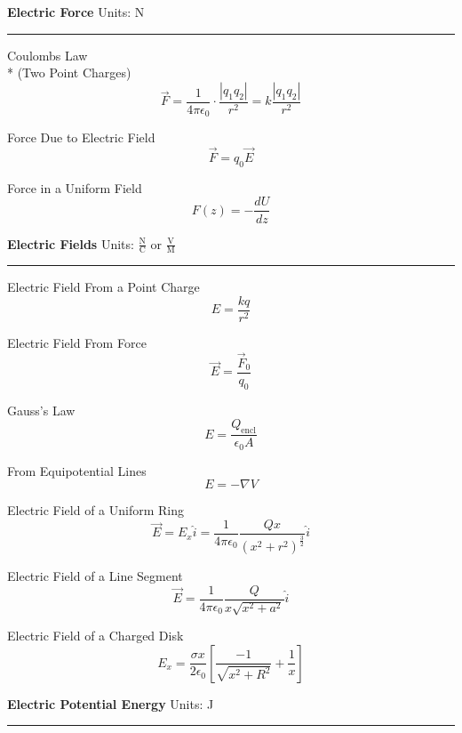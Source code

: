 \documentclass{article}
\begin{document}
\noindent \large \textbf{Electric Force}\normalsize \qquad
Units: N\\
\noindent\rule{\textwidth}{0.5pt}

\begin{center}
\begin{multicols}{3}

Coulombs Law\\*
\footnotesize (Two Point Charges) \normalsize
\[
    \vec{F} = \frac{1}{4\pi\epsilon_0}\cdot\frac{|q_1q_2|}{r^2} = k\frac{|q_1q_2|}{r^2}
\]

Force Due to Electric Field
\[
    \vec{F} = q_0\vec{E}
\]

Force in a Uniform Field
\[
    F(z) = -\frac{dU}{dz}
\]
\end{multicols}
\end{center}
\medskip
\large \textbf{Electric Fields}\normalsize \qquad
Units: $\frac{\textrm{N}}{\textrm{C}}$ or $\frac{\textrm{V}}{\textrm{M}}$\\
\noindent\rule{\textwidth}{0.5pt}

\begin{center}
    \begin{multicols}{4}
        
        Electric Field From a Point Charge
        \[
            E = \frac{kq}{r^2}
        \]
        
        Electric Field From Force
        \[
            \vec{E} = \frac{\vec{F}_0}{q_0}
        \]
        
        Gauss's Law
        \[
            E = \frac{Q_{\textrm{encl}}}{\epsilon_0A}
        \]
        
        From Equipotential Lines
        \[
            E = -\nabla V
        \]
        
    \end{multicols}
    
    \begin{multicols}{3}
    
    Electric Field of a Uniform Ring
    \[
        \vec{E} = E_x\hat{i} = \frac{1}{4\pi\epsilon_0}\frac{Qx}{(x^2+r^2)^{\frac{3}{2}}}\hat{i}
    \]
    
    Electric Field of a Line Segment
    \[
        \vec{E} = \frac{1}{4\pi\epsilon_0}\frac{Q}{x\sqrt{x^2+a^2}}\hat{i}
    \]
    
    Electric Field of a Charged Disk
    \[
        E_x = \frac{\sigma x}{2\epsilon_0}\left[  \frac{-1}{\sqrt{x^2+R^2}}+\frac{1}{x}  \right]
    \]
    
    \end{multicols}
\end{center}
\medskip
\large \textbf{Electric Potential Energy}\normalsize \qquad
Units: J\\
\noindent\rule{\textwidth}{0.5pt}
\end{document}
